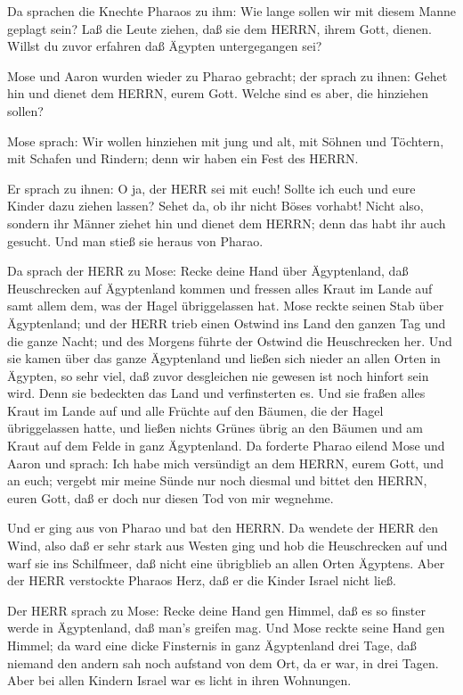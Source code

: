  Da sprachen die Knechte Pharaos zu ihm: Wie lange sollen
wir mit diesem Manne geplagt sein? Laß die Leute ziehen, daß sie dem
HERRN, ihrem Gott, dienen. Willst du zuvor erfahren daß Ägypten
untergegangen sei?

 Mose und Aaron wurden wieder zu Pharao gebracht; der sprach
zu ihnen: Gehet hin und dienet dem HERRN, eurem Gott. Welche sind es
aber, die hinziehen sollen?

 Mose sprach: Wir wollen hinziehen mit jung und alt, mit
Söhnen und Töchtern, mit Schafen und Rindern; denn wir haben ein Fest
des HERRN.

 Er sprach zu ihnen: O ja, der HERR sei mit euch! Sollte
ich euch und eure Kinder dazu ziehen lassen? Sehet da, ob ihr nicht
Böses vorhabt!  Nicht also, sondern ihr Männer ziehet hin
und dienet dem HERRN; denn das habt ihr auch gesucht. Und man stieß sie
heraus von Pharao.

 Da sprach der HERR zu Mose: Recke deine Hand über
Ägyptenland, daß Heuschrecken auf Ägyptenland kommen und fressen alles
Kraut im Lande auf samt allem dem, was der Hagel übriggelassen hat.
 Mose reckte seinen Stab über Ägyptenland; und der HERR
trieb einen Ostwind ins Land den ganzen Tag und die ganze Nacht; und des
Morgens führte der Ostwind die Heuschrecken her.  Und sie
kamen über das ganze Ägyptenland und ließen sich nieder an allen Orten
in Ägypten, so sehr viel, daß zuvor desgleichen nie gewesen ist noch
hinfort sein wird.  Denn sie bedeckten das Land und
verfinsterten es. Und sie fraßen alles Kraut im Lande auf und alle
Früchte auf den Bäumen, die der Hagel übriggelassen hatte, und ließen
nichts Grünes übrig an den Bäumen und am Kraut auf dem Felde in ganz
Ägyptenland.  Da forderte Pharao eilend Mose und Aaron und
sprach: Ich habe mich versündigt an dem HERRN, eurem Gott, und an euch;
 vergebt mir meine Sünde nur noch diesmal und bittet den
HERRN, euren Gott, daß er doch nur diesen Tod von mir wegnehme.

 Und er ging aus von Pharao und bat den HERRN.
 Da wendete der HERR den Wind, also daß er sehr stark aus
Westen ging und hob die Heuschrecken auf und warf sie ins Schilfmeer,
daß nicht eine übrigblieb an allen Orten Ägyptens.  Aber
der HERR verstockte Pharaos Herz, daß er die Kinder Israel nicht ließ.

 Der HERR sprach zu Mose: Recke deine Hand gen Himmel, daß
es so finster werde in Ägyptenland, daß man's greifen mag. 
Und Mose reckte seine Hand gen Himmel; da ward eine dicke Finsternis in
ganz Ägyptenland drei Tage,  daß niemand den andern sah
noch aufstand von dem Ort, da er war, in drei Tagen. Aber bei allen
Kindern Israel war es licht in ihren Wohnungen.

